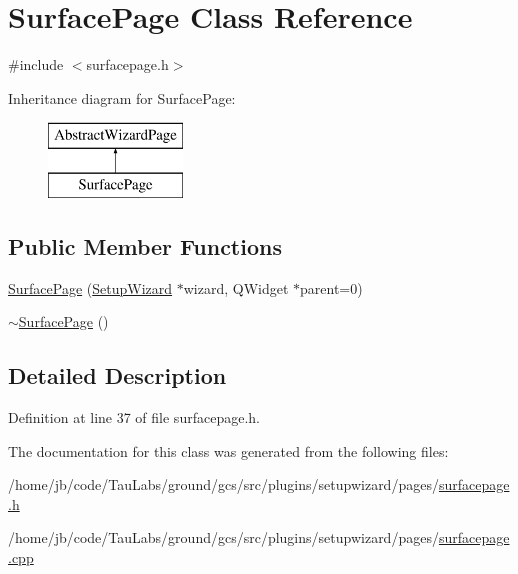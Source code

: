 \hypertarget{class_surface_page}{\section{\-Surface\-Page \-Class \-Reference}
\label{class_surface_page}
}


{\ttfamily \#include $<$surfacepage.\-h$>$}

\-Inheritance diagram for \-Surface\-Page\-:\begin{figure}[H]
\begin{center}
\leavevmode
\includegraphics[height=2.000000cm]{class_surface_page}
\end{center}
\end{figure}
\subsection*{\-Public \-Member \-Functions}
\begin{DoxyCompactItemize}
\item 
\hyperlink{group___surface_page_gabaf6a042908dc3e52b5e4f2c59c32e3a}{\-Surface\-Page} (\hyperlink{class_setup_wizard}{\-Setup\-Wizard} $\ast$wizard, \-Q\-Widget $\ast$parent=0)
\item 
\hyperlink{group___surface_page_ga5a8e3eacbff6da1ddd215db6456358c8}{$\sim$\-Surface\-Page} ()
\end{DoxyCompactItemize}


\subsection{\-Detailed \-Description}


\-Definition at line 37 of file surfacepage.\-h.



\-The documentation for this class was generated from the following files\-:\begin{DoxyCompactItemize}
\item 
/home/jb/code/\-Tau\-Labs/ground/gcs/src/plugins/setupwizard/pages/\hyperlink{surfacepage_8h}{surfacepage.\-h}\item 
/home/jb/code/\-Tau\-Labs/ground/gcs/src/plugins/setupwizard/pages/\hyperlink{surfacepage_8cpp}{surfacepage.\-cpp}\end{DoxyCompactItemize}
